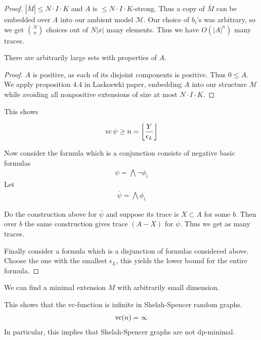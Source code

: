 \documentclass{amsart}
\newcommand{\MM}{\mathscr M}
\providecommand{\floor}[1]{\left \lfloor #1 \right \rfloor }
\begin{document}
\begin{proof}
  $|\bar M| \leq N \cdot I \cdot K$ and $A$ is $\leq N \cdot I \cdot K$-strong.
  Thus a copy of $\bar M$ can be embedded over $A$ into our ambient model $\MM$.
  Our choice of $b_i$'s was arbitrary, so we get ${N \choose n}$ choices out of $N|x|$ many elements.
  Thus we have $O(|A|^n)$ many traces.

  \begin{Lemma}
    There are arbitrarily large sets with properties of $A$.
  \end{Lemma}
  
  \begin{proof}
    $A$ is positive, as each of its disjoint components is positive. Thus $0 \leq A$.
    We apply proposition 4.4 in Laskoswki paper, embedding $A$ into our structure $\MM$ while avoiding all nonpositive extensions of size at most $N \cdot I \cdot K$.
  \end{proof}

  This shows

  \begin{align*}
    \vc \psi \geq n = \floor{\frac{Y}{\epsilon_L}}
  \end{align*}

  Now consider the formula which is a conjunction consists of negative basic formulas
  \begin{align*}
    \psi = \bigwedge \neg \phi_i
  \end{align*}
  Let
  \begin{align*}
    \bar \psi = \bigwedge \phi_i
  \end{align*}

  Do the construction above for $\bar \psi$ and suppose its trace is $X \subset A$ for some $b$.
  Then over $b$ the same construction gives trace $(A - X)$ for $\psi$. Thus we get as many traces.
  
  Finally consider a formula which is a disjunction of formulas considered above.
  Choose the one with the smallest $\epsilon_L$, this yields the lower bound for the entire formula.
\end{proof}

\begin{Claim}
  We can find a minimal extension $M$ with arbitrarily small dimension.
\end{Claim}

\begin{Corollary}
  This shows that the vc-function is infinite in Shelah-Spencer random graphs.
  \begin{align*}
    \operatorname{vc}(n) = \infty
  \end{align*}
  In particular, this implies that Shelah-Spencer graphs are not dp-minimal.
\end{Corollary}
\end{document}
